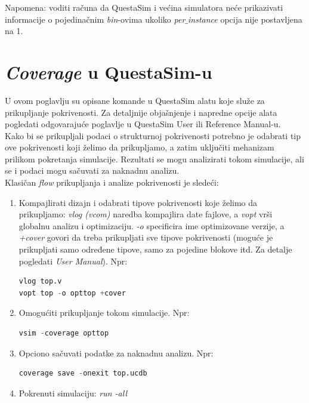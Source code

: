 Napomena: voditi računa da QuestaSim i većina simulatora neće prikazivati
informacije o pojedinačnim \emph{bin}-ovima ukoliko \emph{per\(\_\)instance}
opcija nije postavljena na 1.


\section{\emph{Coverage} u QuestaSim-u}

U ovom poglavlju su opisane komande u QuestaSim alatu koje služe za prikupljanje
pokrivenosti. Za detaljnije objašnjenje i napredne opcije alata pogledati
odgovarajuće poglavlje u QuestaSim User ili Reference Manual-u.\\

Kako bi se prikupljali podaci o strukturnoj pokrivenosti potrebno je odabrati
tip ove pokrivenosti koji želimo da prikupljamo, a zatim uključiti mehanizam
prilikom pokretanja simulacije. Rezultati se mogu analizirati tokom simulacije,
ali se i podaci mogu sačuvati za naknadnu analizu.\\

Klasičan \emph{flow} prikupljanja i analize pokrivenosti je sledeći:

\begin{enumerate}

\item Kompajlirati dizajn i odabrati tipove pokrivenosti koje želimo da
  prikupljamo: \emph{vlog (vcom)} naredba kompajlira date fajlove, a \emph{vopt}
  vrši globalnu analizu i optimizaciju. \emph{-o} specificira ime optimizovane
  verzije, a \emph{+cover} govori da treba prikupljati sve tipove pokrivenosti
  (moguće je prikupljati samo određene tipove, samo za pojedine blokove itd. Za
  detalje pogledati \emph{User Manual}). Npr:
  \begin{lstlisting}[language=Python]
vlog top.v
vopt top -o opttop +cover
\end{lstlisting}

\item Omogućiti prikupljanje tokom simulacije. Npr:
  \begin{lstlisting}[language=Python]
vsim -coverage opttop
\end{lstlisting}

\item Opciono sačuvati podatke za naknadnu analizu. Npr:
  \begin{lstlisting}[language=Python]
coverage save -onexit top.ucdb
\end{lstlisting}

\item Pokrenuti simulaciju: \emph{run -all}
\end{enumerate}

